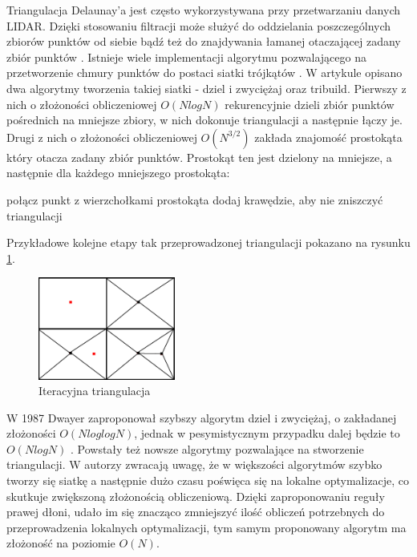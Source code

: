 Triangulacja Delaunay'a jest często wykorzystywana przy przetwarzaniu danych LIDAR. Dzięki stosowaniu filtracji może służyć do oddzielania poszczególnych zbiorów punktów od siebie \cite{koziol2007} bądź też do znajdywania łamanej otaczającej zadany zbiór punktów \cite{website:HumanGeoBlog}. Istnieje wiele implementacji algorytmu pozwalającego na przetworzenie chmury punktów do postaci siatki trójkątów \cite{Lee1980,Dwyer1987,jiang2010}. W artykule \cite{Lee1980} opisano dwa algorytmy tworzenia takiej siatki - dziel i zwyciężaj oraz tribuild. Pierwszy z nich o złożoności obliczeniowej $O(N log N)$ rekurencyjnie dzieli zbiór punktów pośrednich na mniejsze zbiory, w nich dokonuje triangulacji a następnie łączy je. Drugi z nich o złożoności obliczeniowej $O(N^{3/2})$ zakłada znajomość prostokąta który otacza zadany zbiór punktów. Prostokąt ten jest dzielony na mniejsze, a następnie dla każdego mniejszego prostokąta:
\begin{algorithmic}
        \State połącz punkt z wierzchołkami prostokąta
    \Else
        \State dodaj krawędzie, aby nie zniszczyć triangulacji
    \EndIf
    \EndFor
\end{algorithmic}

Przykładowe kolejne etapy tak przeprowadzonej triangulacji pokazano na rysunku \ref{fig:iter_triangulacja}.

\begin{figure}[h!]
    \centering
    \includegraphics[width=0.4\textwidth]{img/iter_triangulacja.jpg}
    \caption{Iteracyjna triangulacja}
    \label{fig:iter_triangulacja}
\end{figure}

W 1987 Dwayer zaproponował szybszy algorytm dziel i zwyciężaj, o zakładanej złożoności $O(N log log N)$, jednak w pesymistycznym przypadku dalej będzie
to $O(N log N)$  \cite{Dwyer1987}. Powstały też nowsze algorytmy pozwalające na stworzenie triangulacji.
W \cite{jiang2010} autorzy zwracają uwagę, że w większości algorytmów szybko tworzy się siatkę a następnie dużo czasu poświęca się na lokalne optymalizacje,
co skutkuje zwiększoną złożonością obliczeniową. Dzięki zaproponowaniu reguły prawej dłoni, udało im się znacząco zmniejszyć
ilość obliczeń potrzebnych do przeprowadzenia lokalnych optymalizacji, tym samym proponowany algorytm ma złożoność na poziomie $O(N)$.

